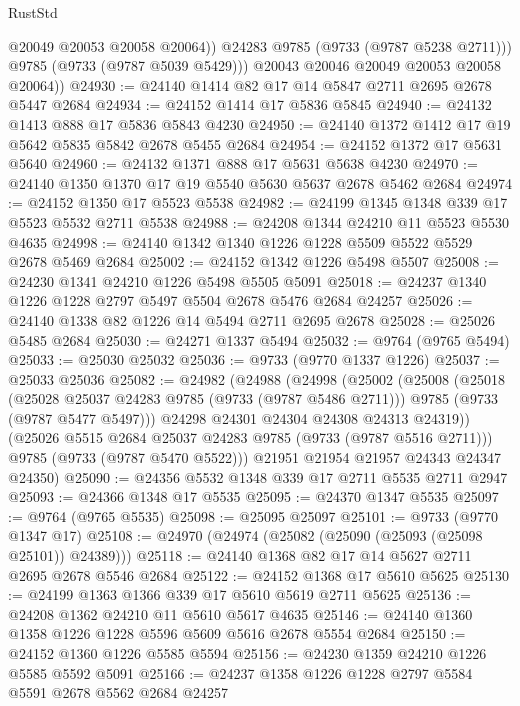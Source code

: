 \begin{lexlean}{RustStd}
\begin{coremodule}
{\begin{coremodule}
{{{{{{{{{{{{{{{{{{{{{{{{{{{{{{{{{{{{{{{{{{{{{{{{{{{{{{{                @20049
                @20053
                @20058
                @20064))
            @24283
            @9785
            (@9733 (@9787 @5238 @2711)))
          @9785
          (@9733 (@9787 @5039 @5429)))
        @20043
        @20046
        @20049
        @20053
        @20058
        @20064))
@24930 := @24140 @1414 @82 @17 @14 @5847 @2711 @2695 @2678 @5447 @2684
@24934 := @24152 @1414 @17 @5836 @5845
@24940 := @24132 @1413 @888 @17 @5836 @5843 @4230
@24950 := @24140 @1372 @1412 @17 @19 @5642 @5835 @5842 @2678 @5455 @2684
@24954 := @24152 @1372 @17 @5631 @5640
@24960 := @24132 @1371 @888 @17 @5631 @5638 @4230
@24970 := @24140 @1350 @1370 @17 @19 @5540 @5630 @5637 @2678 @5462 @2684
@24974 := @24152 @1350 @17 @5523 @5538
@24982 := @24199 @1345 @1348 @339 @17 @5523 @5532 @2711 @5538
@24988 := @24208 @1344 @24210 @11 @5523 @5530 @4635
@24998 := @24140 @1342 @1340 @1226 @1228 @5509 @5522 @5529 @2678 @5469 @2684
@25002 := @24152 @1342 @1226 @5498 @5507
@25008 := @24230 @1341 @24210 @1226 @5498 @5505 @5091
@25018 := @24237 @1340 @1226 @1228 @2797 @5497 @5504 @2678 @5476 @2684 @24257
@25026 := @24140 @1338 @82 @1226 @14 @5494 @2711 @2695 @2678
@25028 := @25026 @5485 @2684
@25030 := @24271 @1337 @5494
@25032 := @9764 (@9765 @5494)
@25033 := @25030 @25032
@25036 := @9733 (@9770 @1337 @1226)
@25037 := @25033 @25036
@25082 := @24982
    (@24988
      (@24998
        (@25002
          (@25008
            (@25018
              (@25028 @25037 @24283 @9785 (@9733 (@9787 @5486 @2711)))
              @9785
              (@9733 (@9787 @5477 @5497)))
            @24298
            @24301
            @24304
            @24308
            @24313
            @24319))
        (@25026 @5515 @2684 @25037 @24283 @9785 (@9733 (@9787 @5516 @2711)))
        @9785
        (@9733 (@9787 @5470 @5522)))
      @21951
      @21954
      @21957
      @24343
      @24347
      @24350)
@25090 := @24356 @5532 @1348 @339 @17 @2711 @5535 @2711 @2947
@25093 := @24366 @1348 @17 @5535
@25095 := @24370 @1347 @5535
@25097 := @9764 (@9765 @5535)
@25098 := @25095 @25097
@25101 := @9733 (@9770 @1347 @17)
@25108 := @24970 (@24974 (@25082 (@25090 (@25093 (@25098 @25101)) @24389)))
@25118 := @24140 @1368 @82 @17 @14 @5627 @2711 @2695 @2678 @5546 @2684
@25122 := @24152 @1368 @17 @5610 @5625
@25130 := @24199 @1363 @1366 @339 @17 @5610 @5619 @2711 @5625
@25136 := @24208 @1362 @24210 @11 @5610 @5617 @4635
@25146 := @24140 @1360 @1358 @1226 @1228 @5596 @5609 @5616 @2678 @5554 @2684
@25150 := @24152 @1360 @1226 @5585 @5594
@25156 := @24230 @1359 @24210 @1226 @5585 @5592 @5091
@25166 := @24237 @1358 @1226 @1228 @2797 @5584 @5591 @2678 @5562 @2684 @24257
}}}}}}}}}}}}}}}}}}}}}}}}}}}}}}}}}}}}}}}}}}}}}}}}}}}}}}}
\end{coremodule}}
\end{coremodule}
\end{lexlean}
